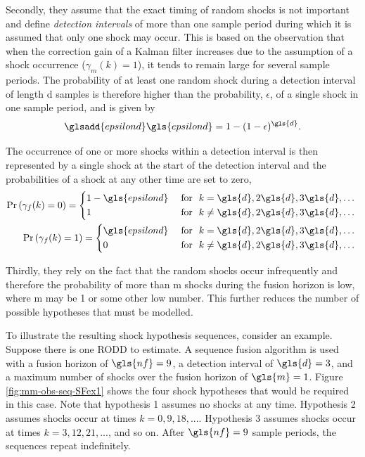 Secondly, they assume that the exact timing of random shocks is not important and define \textit{detection intervals} of more than one sample period during which it is assumed that only one shock may occur. This is based on the observation that when the correction gain of a Kalman filter increases due to the assumption of a shock occurrence ($\gamma_m(k)=1$), it tends to remain large for several sample periods. The probability of at least one random shock during a detection interval of length \gls{d} samples is therefore higher than the probability, $\epsilon$, of a single shock in one sample period, and is given by
\begin{equation}  \label{eq:p_gamma_d}
	\glsadd{epsilond}\gls{epsilond} = 1 - (1 - \epsilon)^{\gls{d}}.
\end{equation}

The occurrence of one or more shocks within a detection interval is then represented by a single shock at the start of the detection interval and the probabilities of a shock at any other time are set to zero,
\begin{equation} \label{eq:Pr_gamma_nd}
	\begin{aligned}
		\Pr\left(\gamma_{f}(k)=0\right) = \begin{cases*}
			1 - \gls{epsilond} & \text { for } $k = \gls{d}, 2\gls{d}, 3\gls{d}, \ldots$ \\
			1 & \text { for } $k \ne \gls{d}, 2\gls{d}, 3\gls{d}, \ldots$
		\end{cases*} \\
		\Pr\left(\gamma_{f}(k)=1\right) = \begin{cases*}
			\gls{epsilond} & \text { for } $k = \gls{d}, 2\gls{d}, 3\gls{d}, \ldots$ \\
			0 & \text { for } $k \ne \gls{d}, 2\gls{d}, 3\gls{d}, \ldots$
		\end{cases*} \\
	\end{aligned}
\end{equation}

Thirdly, they rely on the fact that the random shocks occur infrequently and therefore the probability of more than \gls{m} shocks during the fusion horizon is low, where \gls{m} may be 1 or some other low number. This further reduces the number of possible hypotheses that must be modelled.

To illustrate the resulting shock hypothesis sequences, consider an example. Suppose there is one \gls{RODD} to estimate. A sequence fusion algorithm is used with a fusion horizon of $\gls{nf}=9$, a detection interval of $\gls{d}=3$, and a maximum number of shocks over the fusion horizon of $\gls{m}=1$. Figure \ref{fig:mm-obs-seq-SFex1} shows the four shock hypotheses that would be required in this case. Note that hypothesis 1 assumes no shocks at any time. Hypothesis 2 assumes shocks occur at times $k=0,9,18,...$. Hypothesis 3 assumes shocks occur at times $k=3,12,21,...$, and so on. After $\gls{nf}=9$ sample periods, the sequences repeat indefinitely.

